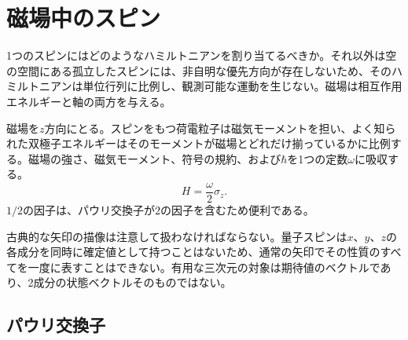 \begin{classroomqa}
\end{classroomqa}

\begin{classroomqa}
\end{classroomqa}

\section{磁場中のスピン}

1つのスピンにはどのようなハミルトニアンを割り当てるべきか。それ以外は空の空間にある孤立したスピンには、非自明な優先方向が存在しないため、そのハミルトニアンは単位行列に比例し、観測可能な運動を生じない。磁場は相互作用エネルギーと軸の両方を与える。

磁場を\(z\)方向にとる。スピンをもつ荷電粒子は磁気モーメントを担い、よく知られた双極子エネルギーはそのモーメントが磁場とどれだけ揃っているかに比例する。磁場の強さ、磁気モーメント、符号の規約、および\(\hbar\)を1つの定数\(\omega\)に吸収する。
\begin{equation}
H=\frac{\omega}{2}\sigma_z.
\label{eq:l5-z-hamiltonian}
\end{equation}
\(1/2\)の因子は、パウリ交換子が\(2\)の因子を含むため便利である。

古典的な矢印の描像は注意して扱わなければならない。量子スピンは\(x\)、\(y\)、\(z\)の各成分を同時に確定値として持つことはないため、通常の矢印でその性質のすべてを一度に表すことはできない。有用な三次元の対象は期待値のベクトルであり、2成分の状態ベクトルそのものではない。

\subsection{パウリ交換子}

